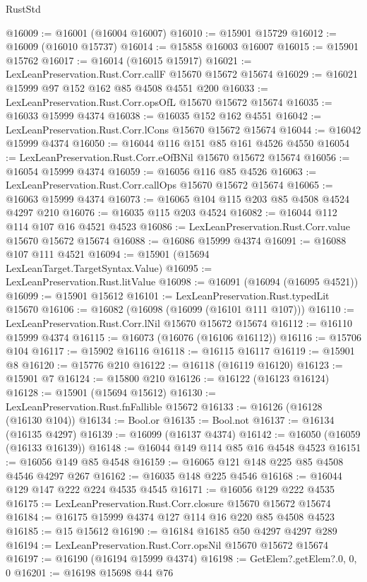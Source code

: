 \begin{lexlean}{RustStd}
\begin{coremodule}
@16009 := @16001 (@16004 @16007)
@16010 := @15901 @15729
@16012 := @16009 (@16010 @15737)
@16014 := @15858 @16003 @16007
@16015 := @15901 @15762
@16017 := @16014 (@16015 @15917)
@16021 := LexLeanPreservation.Rust.Corr.callF @15670 @15672 @15674
@16029 := @16021 @15999 @97 @152 @162 @85 @4508 @4551 @200
@16033 := LexLeanPreservation.Rust.Corr.opsOfL @15670 @15672 @15674
@16035 := @16033 @15999 @4374
@16038 := @16035 @152 @162 @4551
@16042 := LexLeanPreservation.Rust.Corr.lCons @15670 @15672 @15674
@16044 := @16042 @15999 @4374
@16050 := @16044 @116 @151 @85 @161 @4526 @4550
@16054 := LexLeanPreservation.Rust.Corr.eOfBNil @15670 @15672 @15674
@16056 := @16054 @15999 @4374
@16059 := @16056 @116 @85 @4526
@16063 := LexLeanPreservation.Rust.Corr.callOps @15670 @15672 @15674
@16065 := @16063 @15999 @4374
@16073 := @16065 @104 @115 @203 @85 @4508 @4524 @4297 @210
@16076 := @16035 @115 @203 @4524
@16082 := @16044 @112 @114 @107 @16 @4521 @4523
@16086 := LexLeanPreservation.Rust.Corr.value @15670 @15672 @15674
@16088 := @16086 @15999 @4374
@16091 := @16088 @107 @111 @4521
@16094 := @15901 (@15694 LexLeanTarget.TargetSyntax.Value)
@16095 := LexLeanPreservation.Rust.litValue
@16098 := @16091 (@16094 (@16095 @4521))
@16099 := @15901 @15612
@16101 := LexLeanPreservation.Rust.typedLit @15670
@16106 := @16082 (@16098 (@16099 (@16101 @111 @107)))
@16110 := LexLeanPreservation.Rust.Corr.lNil @15670 @15672 @15674
@16112 := @16110 @15999 @4374
@16115 := @16073 (@16076 (@16106 @16112))
@16116 := @15706 @104
@16117 := @15902 @16116
@16118 := @16115 @16117
@16119 := @15901 @8
@16120 := @15776 @210
@16122 := @16118 (@16119 @16120)
@16123 := @15901 @7
@16124 := @15800 @210
@16126 := @16122 (@16123 @16124)
@16128 := @15901 (@15694 @15612)
@16130 := LexLeanPreservation.Rust.fnFallible @15672
@16133 := @16126 (@16128 (@16130 @104))
@16134 := Bool.or
@16135 := Bool.not
@16137 := @16134 (@16135 @4297)
@16139 := @16099 (@16137 @4374)
@16142 := @16050 (@16059 (@16133 @16139))
@16148 := @16044 @149 @114 @85 @16 @4548 @4523
@16151 := @16056 @149 @85 @4548
@16159 := @16065 @121 @148 @225 @85 @4508 @4546 @4297 @267
@16162 := @16035 @148 @225 @4546
@16168 := @16044 @129 @147 @222 @224 @4535 @4545
@16171 := @16056 @129 @222 @4535
@16175 := LexLeanPreservation.Rust.Corr.closure @15670 @15672 @15674
@16184 := @16175 @15999 @4374 @127 @114 @16 @220 @85 @4508 @4523
@16185 := @15 @15612
@16190 := @16184 @16185 @50 @4297 @4297 @289
@16194 := LexLeanPreservation.Rust.Corr.opsNil @15670 @15672 @15674
@16197 := @16190 (@16194 @15999 @4374)
@16198 := GetElem?.getElem?.{0, 0, 0}
@16201 := @16198 @15698 @44 @76

\end{coremodule}
\end{lexlean}
